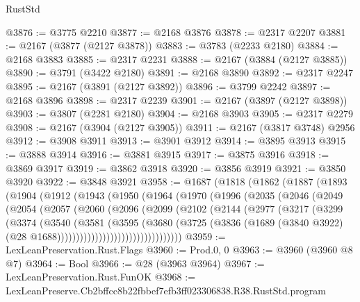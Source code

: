 \begin{lexlean}{RustStd}
\begin{coremodule}
@3876 := @3775 @2210
@3877 := @2168 @3876
@3878 := @2317 @2207
@3881 := @2167 (@3877 (@2127 @3878))
@3883 := @3783 (@2233 @2180)
@3884 := @2168 @3883
@3885 := @2317 @2231
@3888 := @2167 (@3884 (@2127 @3885))
@3890 := @3791 (@3422 @2180)
@3891 := @2168 @3890
@3892 := @2317 @2247
@3895 := @2167 (@3891 (@2127 @3892))
@3896 := @3799 @2242
@3897 := @2168 @3896
@3898 := @2317 @2239
@3901 := @2167 (@3897 (@2127 @3898))
@3903 := @3807 (@2281 @2180)
@3904 := @2168 @3903
@3905 := @2317 @2279
@3908 := @2167 (@3904 (@2127 @3905))
@3911 := @2167 (@3817 @3748) @2956
@3912 := @3908 @3911
@3913 := @3901 @3912
@3914 := @3895 @3913
@3915 := @3888 @3914
@3916 := @3881 @3915
@3917 := @3875 @3916
@3918 := @3869 @3917
@3919 := @3862 @3918
@3920 := @3856 @3919
@3921 := @3850 @3920
@3922 := @3848 @3921
@3958 := @1687
    (@1818
      (@1862
        (@1887
          (@1893
            (@1904
              (@1912
                (@1943
                  (@1950
                    (@1964
                      (@1970
                        (@1996
                          (@2035
                            (@2046
                              (@2049
                                (@2054
                                  (@2057
                                    (@2060
                                      (@2096
                                        (@2099
                                          (@2102
                                            (@2144
                                              (@2977
                                                (@3217
                                                  (@3299
                                                    (@3374
                                                      (@3540
                                                        (@3581
                                                          (@3595
                                                            (@3680
                                                              (@3725
                                                                (@3836
                                                                  (@1689
                                                                    (@3840 @3922)
                                                                    (@28
                                                                      @1688)))))))))))))))))))))))))))))))))
@3959 := LexLeanPreservation.Rust.Flags
@3960 := Prod.{0, 0}
@3963 := @3960 (@3960 @8 @7)
@3964 := Bool
@3966 := @28 (@3963 @3964)
@3967 := LexLeanPreservation.Rust.FunOK
@3968 := LexLeanPreserve.Cb2bffcc8b22fbbef7efb3ff023306838.R38.RustStd.program

\end{coremodule}
\end{lexlean}
